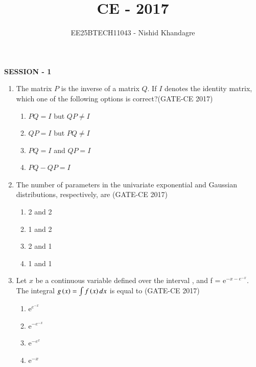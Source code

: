 \documentclass[journal,12pt,onecolumn]{article}
\theoremstyle{remark}
\begin{document}
\title{CE - 2017}
\author{EE25BTECH11043 - Nishid Khandagre}
\date{}
\maketitle

\renewcommand{\thefigure}{\theenumi}
\renewcommand{\thetable}{\theenumi}

\textbf{SESSION - 1}

\begin{enumerate}
    \item The matrix $P$ is the inverse of a matrix $Q$. If $I$ denotes the identity matrix, which one of the following options is correct?\hfill (GATE-CE 2017)
    \begin{multicols}{2}
    \begin{enumerate}
        \item $PQ = I$ but $QP \neq I$
        \item $QP = I$ but $PQ \neq I$
        \item $PQ = I$ and $QP = I$
        \item $PQ - QP = I$
    \end{enumerate}
    \end{multicols}

    \item The number of parameters in the univariate exponential and Gaussian distributions, respectively, are 
    \hfill (GATE-CE 2017)
    \begin{multicols}{4}
    \begin{enumerate}
        \item 2 and 2 
        \item 1 and 2 
        \item 2 and 1 
        \item 1 and 1
    \end{enumerate}
    \end{multicols}

    \item Let $x$ be a continuous variable defined over the interval \brak{-\infty, \infty}, and f = e$^{{-x} - e^{-x}}$. The integral $g\left(x\right)=\int f\left(x\right) dx$ is equal to 
    \hfill (GATE-CE 2017)
    \begin{multicols}{2}
    \begin{enumerate}
        \item e$^{e^{-x}}$
        \item e$^{-e^{-x}}$
        \item e$^{-e^x}$
        \item e$^{-x}$
    \end{enumerate}
    \end{multicols}


\end{enumerate}
\end{document}
